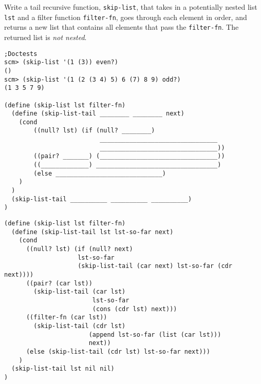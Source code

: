 \begin{blocksection}

\question Write a tail recursive function, \lstinline{skip-list}, that takes in a potentially nested list \lstinline{lst} and a filter function \lstinline{filter-fn}, goes through each element in order, and returns a new list that contains all elements that pass the \lstinline{filter-fn}. The returned list is \textit{not nested}.

\begin{lstlisting}
;Doctests
scm> (skip-list '(1 (3)) even?)
()
scm> (skip-list '(1 (2 (3 4) 5) 6 (7) 8 9) odd?)
(1 3 5 7 9)

(define (skip-list lst filter-fn) 
  (define (skip-list-tail ________ ________ next)
    (cond
        ((null? lst) (if (null? ________) 
                          ________________________________
                          ________________________________))
        ((pair? _______) (________________________________))
        ((_____________) _________________________________)
        (else _____________________________)
    )
  )
  (skip-list-tail __________ __________ __________)
)
\end{lstlisting}
\end{blocksection}

\begin{blocksection}
\begin{solution}
\begin{lstlisting}
(define (skip-list lst filter-fn) 
  (define (skip-list-tail lst lst-so-far next)
    (cond
      ((null? lst) (if (null? next) 
                    lst-so-far
                    (skip-list-tail (car next) lst-so-far (cdr next))))
      ((pair? (car lst)) 
        (skip-list-tail (car lst) 
                        lst-so-far 
                        (cons (cdr lst) next)))
      ((filter-fn (car lst)) 
        (skip-list-tail (cdr lst) 
                       (append lst-so-far (list (car lst))) 
                       next))
      (else (skip-list-tail (cdr lst) lst-so-far next)))
    )
  (skip-list-tail lst nil nil)
)

\end{lstlisting}
\end{solution}

\end{blocksection}